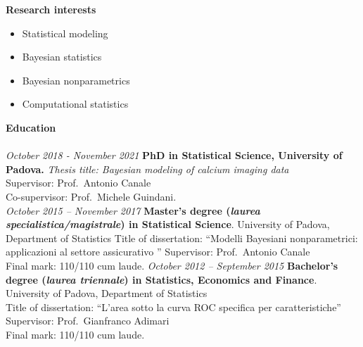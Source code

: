 \documentclass[10pt]{amsart}
\begin{document}
	{\large {\bf Research interests}} \\[-.08cm] 
	\underline{\hspace{6in}} 
	\begin{itemize}
	\item 	Statistical modeling
	\item 	Bayesian statistics
	\item	Bayesian nonparametrics
	\item 	Computational statistics
	\end{itemize}
		\vspace{2ex}
	{\large {\bf Education}} \\[-.08cm] 
	\underline{\hspace{6in}} \\[.2cm] 
	{\it October 2018 - November 2021}\newline
	{\bf PhD in Statistical Science,  University of Padova. 
	} 
	\newline 
	{\it Thesis title: Bayesian modeling of calcium imaging data }\\
	Supervisor: Prof.\ Antonio Canale\\
	Co-supervisor: Prof.\ Michele Guindani.	\\ \newline
		{\it October 2015 -- November 2017 } \newline
	{\bf Master's degree ({\it laurea specialistica/magistrale}) in Statistical Science}.\newline
	University of Padova, Department of Statistics \newline
	Title of dissertation: ``Modelli Bayesiani nonparametrici: applicazioni al settore assicurativo   '' \newline
	 	Supervisor: Prof.\ Antonio Canale\\
	Final mark: 110/110 cum laude.
	\newline\newline
	 	{\it October 2012 -- September 2015} \newline
	{\bf Bachelor's degree ({\it laurea triennale}) in Statistics, Economics and Finance}. \newline
	University of Padova, Department of Statistics \\
	Title of dissertation: ``L’area sotto la curva ROC specifica per caratteristiche'' \newline
	Supervisor: Prof.\  Gianfranco Adimari\\
	Final mark:  110/110 cum laude.
	\newline\newline
	  \newpage
	  
\end{document}
